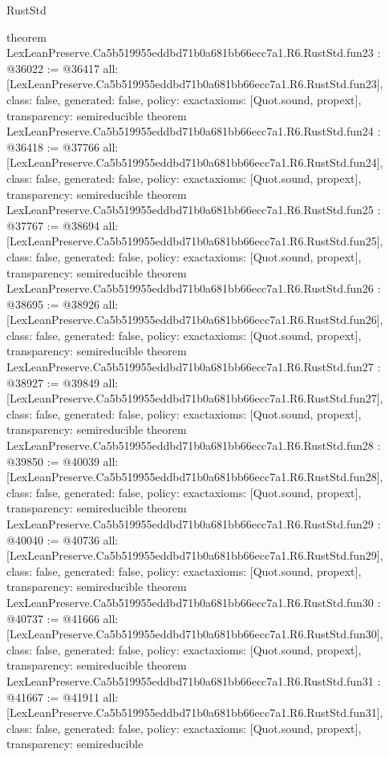 \begin{lexlean}{RustStd}
\begin{coremodule}
{}
theorem LexLeanPreserve.Ca5b519955eddbd71b0a681bb66ecc7a1.R6.RustStd.fun23 : @36022 := @36417 {
  all: [LexLeanPreserve.Ca5b519955eddbd71b0a681bb66ecc7a1.R6.RustStd.fun23],
  class: false,
  generated: false,
  policy: exact{axioms: [Quot.sound, propext]},
  transparency: semireducible
}
theorem LexLeanPreserve.Ca5b519955eddbd71b0a681bb66ecc7a1.R6.RustStd.fun24 : @36418 := @37766 {
  all: [LexLeanPreserve.Ca5b519955eddbd71b0a681bb66ecc7a1.R6.RustStd.fun24],
  class: false,
  generated: false,
  policy: exact{axioms: [Quot.sound, propext]},
  transparency: semireducible
}
theorem LexLeanPreserve.Ca5b519955eddbd71b0a681bb66ecc7a1.R6.RustStd.fun25 : @37767 := @38694 {
  all: [LexLeanPreserve.Ca5b519955eddbd71b0a681bb66ecc7a1.R6.RustStd.fun25],
  class: false,
  generated: false,
  policy: exact{axioms: [Quot.sound, propext]},
  transparency: semireducible
}
theorem LexLeanPreserve.Ca5b519955eddbd71b0a681bb66ecc7a1.R6.RustStd.fun26 : @38695 := @38926 {
  all: [LexLeanPreserve.Ca5b519955eddbd71b0a681bb66ecc7a1.R6.RustStd.fun26],
  class: false,
  generated: false,
  policy: exact{axioms: [Quot.sound, propext]},
  transparency: semireducible
}
theorem LexLeanPreserve.Ca5b519955eddbd71b0a681bb66ecc7a1.R6.RustStd.fun27 : @38927 := @39849 {
  all: [LexLeanPreserve.Ca5b519955eddbd71b0a681bb66ecc7a1.R6.RustStd.fun27],
  class: false,
  generated: false,
  policy: exact{axioms: [Quot.sound, propext]},
  transparency: semireducible
}
theorem LexLeanPreserve.Ca5b519955eddbd71b0a681bb66ecc7a1.R6.RustStd.fun28 : @39850 := @40039 {
  all: [LexLeanPreserve.Ca5b519955eddbd71b0a681bb66ecc7a1.R6.RustStd.fun28],
  class: false,
  generated: false,
  policy: exact{axioms: [Quot.sound, propext]},
  transparency: semireducible
}
theorem LexLeanPreserve.Ca5b519955eddbd71b0a681bb66ecc7a1.R6.RustStd.fun29 : @40040 := @40736 {
  all: [LexLeanPreserve.Ca5b519955eddbd71b0a681bb66ecc7a1.R6.RustStd.fun29],
  class: false,
  generated: false,
  policy: exact{axioms: [Quot.sound, propext]},
  transparency: semireducible
}
theorem LexLeanPreserve.Ca5b519955eddbd71b0a681bb66ecc7a1.R6.RustStd.fun30 : @40737 := @41666 {
  all: [LexLeanPreserve.Ca5b519955eddbd71b0a681bb66ecc7a1.R6.RustStd.fun30],
  class: false,
  generated: false,
  policy: exact{axioms: [Quot.sound, propext]},
  transparency: semireducible
}
theorem LexLeanPreserve.Ca5b519955eddbd71b0a681bb66ecc7a1.R6.RustStd.fun31 : @41667 := @41911 {
  all: [LexLeanPreserve.Ca5b519955eddbd71b0a681bb66ecc7a1.R6.RustStd.fun31],
  class: false,
  generated: false,
  policy: exact{axioms: [Quot.sound, propext]},
  transparency: semireducible
}
\end{coremodule}
\end{lexlean}
